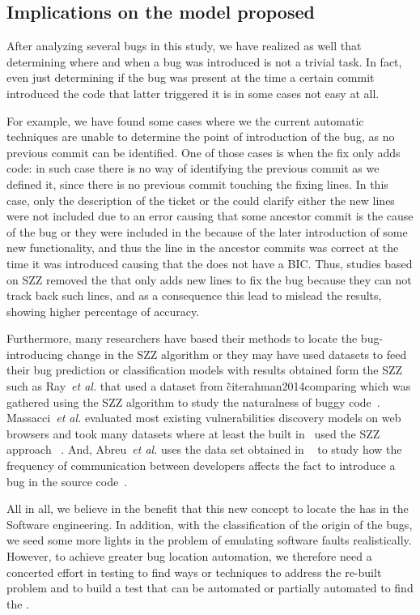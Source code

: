\documentclass[a4paper, 12pt]{book}
\begin{document}
\subsection{Implications on the model proposed}
\label{subsec:implications}
After analyzing several bugs in this study, we have realized as well that determining where and when a bug was introduced is not a trivial task. In fact, even just determining if the bug was present at the time a certain commit introduced the code that latter triggered it is in some cases not easy at all.

For example, we have found some cases where we the current automatic techniques are unable to determine the point of introduction of the bug, as no previous commit can be identified. One of those cases is when the fix only adds code: in such case there is no way of identifying the previous commit as we defined it, since there is no previous commit touching the fixing lines. In this case, only the description of the ticket or the \BFC could clarify either the new lines were not included due to an error causing that some  ancestor commit is the cause of the bug or they were included in the \BFC because of the later introduction of some new functionality, and thus the line in the ancestor commits was correct at the time it was introduced causing that the \BFC does not have a BIC. Thus, studies based on SZZ removed the \BFC that only adds new lines to fix the bug because they can not track back such lines, and as a consequence this lead to mislead the results, showing higher percentage of accuracy.

Furthermore, many researchers have based their methods to locate the bug-introducing change in the SZZ algorithm or they may have used datasets to feed their bug prediction or classification models with results obtained form the SZZ such as Ray~\emph{et al.} that used a dataset from \~cite{rahman2014comparing} which was gathered using the SZZ algorithm to study the naturalness of buggy code~\cite{ray2016naturalness}. Massacci~\emph{et al.} evaluated most existing vulnerabilities discovery models on web browsers and took many datasets where at least the built in~\cite{neuhaus2007predicting} used the SZZ approach ~\cite{massacci2014empirical}. And, Abreu~\emph{et al.} uses the data set obtained in ~\cite{sliwerski2005changes} to study how the frequency of communication between developers affects the fact to introduce a bug in the source code~\cite{abreu2009developer}.


All in all, we believe in the benefit that this new concept to locate the \FFC has in the Software engineering. In addition, with the classification of the origin of the bugs, we seed some more lights in the problem of emulating software faults realistically. However, to achieve greater bug location automation, we therefore need a concerted effort in testing to find ways or techniques to address the re-built problem and to build a test that can be automated or partially automated to find the \FFC.%
\end{document}
